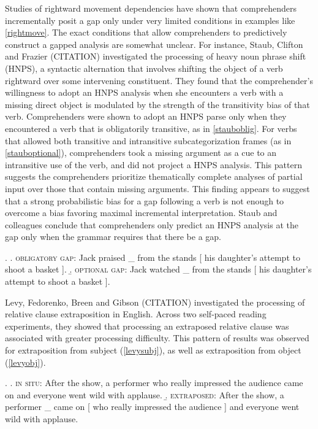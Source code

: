 \documentclass[12pt]{article}
\begin{document}
	Studies of rightward movement dependencies have shown that comprehenders incrementally posit a gap only under very limited conditions in examples like \ref{rightmove}. The exact conditions that allow comprehenders to predictively construct a gapped analysis are somewhat unclear. For instance, Staub, Clifton and Frazier (CITATION) investigated the processing of heavy noun phrase shift (HNPS), a syntactic alternation that involves shifting the object of a verb rightward over some intervening constituent. They found that the comprehender's willingness to adopt an HNPS analysis when she encounters a verb with a missing direct object is modulated by the strength of the transitivity bias of that verb. Comprehenders were shown to adopt an HNPS parse only when they encountered a verb that is obligatorily transitive, as in \ref{stauboblig}. For verbs that allowed both transitive and intransitive subcategorization frames (as in \ref{stauboptional}), comprehenders took a missing argument as a cue to an intransitive use of the verb, and did not project a HNPS analysis. This pattern suggests the comprehenders prioritize thematically complete analyses of partial input over those that contain missing arguments. This finding appears to suggest that a strong probabilistic bias for a gap following a verb is not enough to overcome a bias favoring maximal incremental interpretation. Staub and colleagues conclude that comprehenders only predict an HNPS analysis at the gap only when the grammar requires that there be a gap.

		\ex.	\label{hnpsstaub}
		\a.	\label{stauboblig} \textsc{obligatory gap}: Jack praised \_ from the stands [ his daughter's attempt to shoot a basket ].
		\b.	\label{stauboptional} \textsc{optional gap}: Jack watched \_ from the stands [ his daughter's attempt to shoot a basket ]. 

	Levy, Fedorenko, Breen and Gibson (CITATION) investigated the processing of relative clause extraposition in English. Across two self-paced reading experiments, they showed that processing an extraposed relative clause was associated with greater processing difficulty. This pattern of results was observed for extraposition from subject (\ref{levysubj}), as well as extraposition from object (\ref{levyobj}). 
	
			\ex.	\label{levysubj}
					\a.	 \textsc{in situ}: After the show, a performer who really impressed the audience came on and everyone went wild with applause.
					\b.	 \textsc{extraposed}: After the show, a performer \_ came on [ who really impressed the audience ] and everyone went wild with applause.
\end{document}

